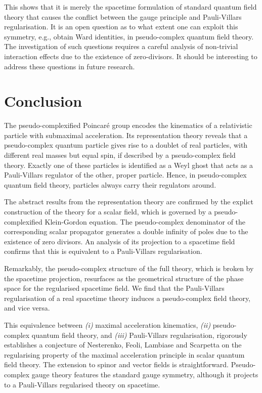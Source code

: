 \documentclass[a4paper,aps,prd,showkeys,showpacs,superscriptaddress,preprint]{revtex4}
\begin{document}
This shows that it is merely the spacetime formulation of standard
quantum field theory that causes the conflict between the gauge
principle and Pauli-Villars regularisation.
It is an open question as to what extent one can exploit
this symmetry, e.g., obtain Ward identities, in pseudo-complex quantum
field theory. The investigation of such questions requires a careful
analysis of non-trivial interaction effects due to the existence of
zero-divisors. It should be interesting to address these questions in
future research. 

\section{Conclusion\label{sec_conclusion}}
The pseudo-complexified Poincar\'e group encodes the kinematics of a
relativistic particle with submaximal acceleration. Its representation
theory reveals that a pseudo-complex quantum particle gives rise to a doublet
of real particles, with different real masses but equal spin, if
described by a pseudo-complex field theory. Exactly one of these
particles is identified as a Weyl ghost that acts as a
Pauli-Villars regulator of the other, proper particle. Hence, in
pseudo-complex quantum field theory, particles always carry their
regulators around.

The abstract results from the representation theory are confirmed by
the explict construction of the theory for a scalar field, which is
governed by a pseudo-complexified Klein-Gordon equation. 
The pseudo-complex denominator of the
corresponding scalar propagator generates a double infinity of poles
due to the existence of zero divisors. An analysis of its
projection to a spacetime field confirms that this is equivalent to a
Pauli-Villars regularisation. 

Remarkably, the pseudo-complex structure of the full
theory, which is broken by the spacetime projection, resurfaces as the
geometrical structure of the phase space for the regularised spacetime
field.  
We find that the Pauli-Villars regularisation of a real
spacetime theory induces a pseudo-complex field theory, and vice versa. 

This equivalence between \textsl{(i)} maximal acceleration kinematics, 
\textsl{(ii)} pseudo-complex quantum field theory, and \textsl{(iii)} 
Pauli-Villars regularisation,
rigorously establishes a conjecture of Nesterenko, Feoli,
Lambiase and Scarpetta \cite{Nesterenko:1998jt} on the regularising
property of the maximal acceleration principle in scalar quantum field
theory.
The extension to spinor and vector fields is straightforward. 
Pseudo-complex gauge theory features the standard gauge symmetry, 
although it projects to a Pauli-Villars regularised theory on spacetime.
\end{document}

